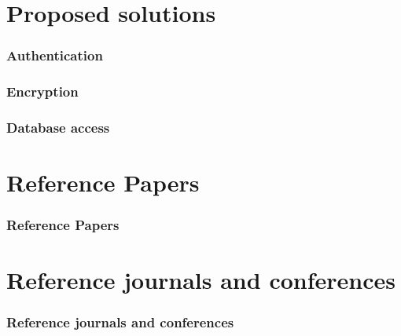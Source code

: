 \documentclass{beamer}
\begin{document}
\section{Proposed solutions}


\begin{frame}
\frametitle{Authentication}
\end{frame}

\begin{frame}
\frametitle{Encryption}
\end{frame}

\begin{frame}
\frametitle{Database access}
\end{frame}

\section{Reference Papers}


\begin{frame}
\frametitle{Reference Papers}
\end{frame}

\section{Reference journals and conferences}

\begin{frame}
\frametitle{Reference journals and conferences}
\end{frame}
\end{document}
